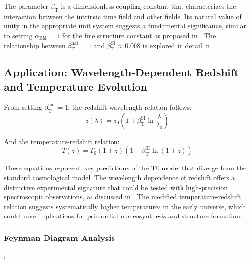 \documentclass[12pt,a4paper]{article}
\newcommand{\alphaEM}{\alpha_{\text{EM}}}
\newcommand{\betaT}{\beta_{\text{T}}}
\begin{document}
	The parameter \(\betaT\) is a dimensionless coupling constant that characterizes the interaction between the intrinsic time field and other fields. Its natural value of unity in the appropriate unit system suggests a fundamental significance, similar to setting \(\alphaEM = 1\) for the fine structure constant as proposed in \cite{pascher_alpha_2025}. The relationship between \(\betaT^{\text{nat}} = 1\) and \(\betaT^{\text{SI}} \approx 0.008\) is explored in detail in \cite{pascher_alphabeta_2025}.
	
	\subsection{Application: Wavelength-Dependent Redshift and Temperature Evolution}
	\label{subsec:wavelength_redshift}
	
	From setting \(\betaT^{\text{nat}} = 1\), the redshift-wavelength relation follows:
	\begin{equation}
		z(\lambda) = z_0 \left(1 + \betaT^{\text{SI}} \ln \frac{\lambda}{\lambda_0}\right)
	\end{equation}
	
	And the temperature-redshift relation:
	\begin{equation}
		T(z) = T_0 (1 + z) (1 + \betaT^{\text{SI}} \ln(1 + z))
	\end{equation}
	
	These equations represent key predictions of the T0 model that diverge from the standard cosmological model. The wavelength dependence of redshift offers a distinctive experimental signature that could be tested with high-precision spectroscopic observations, as discussed in \cite{pascher_messdifferenzen_2025}. The modified temperature-redshift relation suggests systematically higher temperatures in the early universe, which could have implications for primordial nucleosynthesis and structure formation.
	
	\subsubsection{Feynman Diagram Analysis}
	\label{subsubsec:feynman_diagram}
	
	\begin{center}
		;
	\end{center}
	
\end{document}
